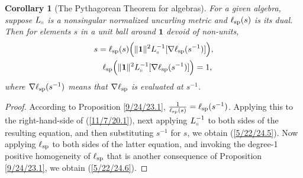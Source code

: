\documentclass{amsart}
\newtheorem{corollary}[theorem]{Corollary}
\theoremstyle{definition}
\numberwithin{theorem}{section}
\numberwithin{equation}{section}
\begin{document}
\begin{corollary}[The Pythagorean Theorem for algebras]\label{10/7/25.1} For a given algebra, suppose $L_{\shortparallel}$ is a nonsingular normalized uncurling metric and $\ell_{\rm sp}(s)$ is its dual.  Then for elements $s$ in a unit ball around $\mathbf{1}$ devoid of non-units,
   \begin{eqnarray}\label{5/22/24.5}  s = \ell_{\rm sp}(s)\Big(\|\mathbf{1}\|^2 L_{\shortparallel}^{-1}[\nabla\ell_{\rm sp}(s^{-1})]\Big),\\
\label{5/22/24.6}\ell_{\rm sp}\Big(\|\mathbf{1}\|^2 L_{\shortparallel}^{-1}[\nabla\ell_{\rm sp}(s^{-1})]\Big) = 1,\,\end{eqnarray}
where $\nabla\ell_{\rm sp}(s^{-1})$ means that $\nabla\ell_{\rm sp}$ is evaluated at $s^{-1}$.
\end{corollary} 
\begin{proof}
According to Proposition \ref{9/24/23.1}, $\frac{1}{\ell_{\rm sp}(s)}  = \ell_{\rm sp}(s^{-1})$.  Applying this to the right-hand-side of (\ref{11/7/20.1}), next applying $L_{\shortparallel}^{-1}$ to both sides of the resulting equation, and then substituting $s^{-1}$ for $s$, we obtain (\ref{5/22/24.5}).  Now applying $\ell_{\rm sp}$ to both sides of the latter equation, and invoking the degree-1 positive homogeneity of $\ell_{\rm sp}$ that is another consequence of Proposition \ref{9/24/23.1}, we obtain (\ref{5/22/24.6}).
\end{proof}
  
\end{document}
